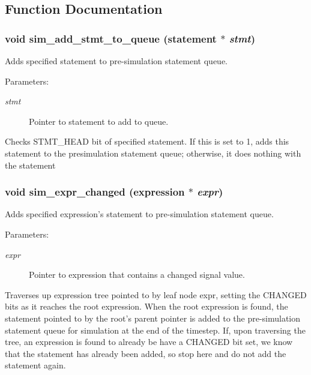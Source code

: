 \subsection{Function Documentation}
\subsubsection{\setlength{\rightskip}{0pt plus 5cm}void sim\_\-add\_\-stmt\_\-to\_\-queue ({\bf statement} $\ast$ {\em stmt})}\label{sim_8h_a1}


Adds specified statement to pre-simulation statement queue.

\begin{Desc}
\item[Parameters: ]\par
\begin{description}
\item[{\em 
stmt}]Pointer to statement to add to queue.\end{description}
\end{Desc}
Checks STMT\_\-HEAD bit of specified statement. If this is set to 1, adds this statement to the presimulation statement queue; otherwise, it does nothing with the statement 
\subsubsection{\setlength{\rightskip}{0pt plus 5cm}void sim\_\-expr\_\-changed ({\bf expression} $\ast$ {\em expr})}\label{sim_8h_a0}


Adds specified expression's statement to pre-simulation statement queue.

\begin{Desc}
\item[Parameters: ]\par
\begin{description}
\item[{\em 
expr}]Pointer to expression that contains a changed signal value.\end{description}
\end{Desc}
Traverses up expression tree pointed to by leaf node expr, setting the CHANGED bits as it reaches the root expression. When the root expression is found, the statement pointed to by the root's parent pointer is added to the pre-simulation statement queue for simulation at the end of the timestep. If, upon traversing the tree, an expression is found to already be have a CHANGED bit set, we know that the statement has already been added, so stop here and do not add the statement again. 
